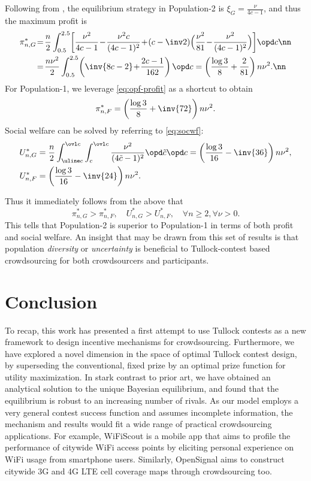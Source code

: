 \documentclass{sig-alternate-10pt}
\begin{document}
Following from , the equilibrium strategy in Population-2 is
$\xi_G = \frac{\nu}{4c - 1}$, and thus the maximum profit is
\begin{align}\label{eq:opf-profit-Gn}
\pi_{n,G}^* \! &=\! \frac{n}{2} \int_{0.5}^{2.5}\! \left[ 
\frac{\nu^2}{4c-1}\! - \!\frac{\nu^2 c}{(4c-1)^2}\! +\! 
(c-\inv 2) \Big(\frac{\nu^2}{81}\! - \!\frac{\nu^2}{(4c-1)^2}\Big) \right]\! \opd c \nn\\
&=\! \frac{n \nu^2}{2} \int_{0.5}^{2.5}\! \left( \inv{8c-2}\! +\! \frac{2c-1}{162} \right) \opd c
= \left( \frac{\log 3}{8} + \frac{2}{81} \right) n \nu^2. \nn 
\end{align}
For Population-1, we leverage \eqref{eq:opf-profit} as a shortcut to obtain
\begin{align}
\pi_{n,F}^* = \left( \frac{\log 3}{8} + \inv{72} \right) n \nu^2.
\end{align}
Social welfare can be solved by referring to \eqref{eq:socwf}:
\begin{align*}
U^*_{n,G} &= \frac{n}{2} \int_{\uline c}^{\ovl c} \int_{c}^{\ovl c} \frac{\nu^2}{(4\tilde c -1)^2} \opd \tilde c \opd c
= \left(\frac{\log 3}{16} - \inv{36}\right) n \nu^2, \\
U^*_{n,F} &= \left(\frac{\log 3}{16} - \inv{24}\right) n \nu^2.
\end{align*}

Thus it immediately follows from the above that
\[  \pi_{n,G}^* > \pi_{n,F}^*, \quad U^*_{n,G} > U^*_{n,F}, \quad \forall n\ge 2, \forall \nu>0.\]
This tells that Population-2 is superior to Population-1 in terms of both profit and social welfare. An insight that may be drawn from this set of results is that population {\em diversity} or {\em uncertainty} is beneficial to Tullock-contest based crowdsourcing for both crowdsourcers and participants.


\section{Conclusion}\label{sec:conc}

To recap, this work has presented a first attempt to use Tullock contests as a new framework to design incentive mechanisms for crowdsourcing. Furthermore, we have explored a novel dimension in the space of optimal Tullock contest design, by superseding the conventional, fixed prize by an optimal prize function for utility maximization. In stark contrast to prior art, we have obtained an analytical solution to the unique Bayesian equilibrium, and found that the equilibrium is robust to an increasing number of rivals. As our model employs a very general contest success function and assumes incomplete information, the mechanism and results would fit a wide range of practical crowdsourcing applications.
For example, WiFiScout\cite{wifiscout14mass} is a mobile app that aims to profile the performance of citywide WiFi access points by eliciting personal experience on WiFi usage from smartphone users. Similarly, OpenSignal\cite{opensignal} aims to construct citywide 3G and 4G LTE cell coverage maps through crowdsourcing too.
\end{document}
